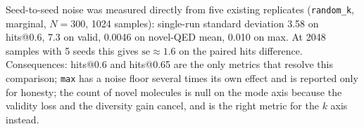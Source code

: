 \documentclass[11pt]{article}
\begin{document}
Seed-to-seed noise was measured directly from five existing replicates
(\texttt{random\_k}, marginal, $N=300$, 1024 samples): single-run standard
deviation 3.58 on hits@0.6, 7.3 on valid, 0.0046 on novel-QED mean, 0.010 on
max. At 2048 samples with 5 seeds this gives $\mathrm{se}\approx1.6$ on the
paired hits difference. Consequences: hits@0.6 and hits@0.65 are the only
metrics that resolve this comparison; \texttt{max} has a noise floor several
times its own effect and is reported only for honesty; the count of novel
molecules is null on the mode axis because the validity loss and the diversity
gain cancel, and is the right metric for the $k$ axis instead.
\end{document}

